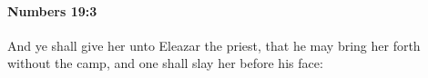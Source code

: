 
		\paragraph{Numbers 19:3} %
			\label{NUMBERS-19-3}

			And ye shall give her unto Eleazar the priest, that he may bring her forth without the camp, and one shall slay her before his face:


